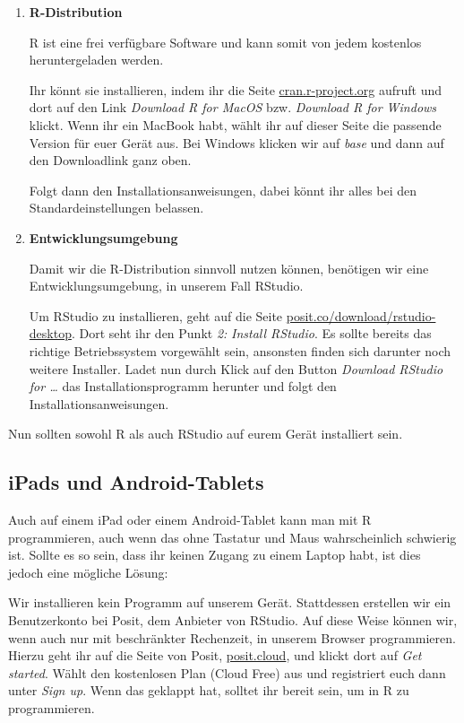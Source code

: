 \documentclass[
  letterpaper,
  DIV=11,
  numbers=noendperiod]{scrartcl}
\begin{document}
\begin{enumerate}
\def\labelenumi{\arabic{enumi}.}
\item
  \textbf{R-Distribution}

  R ist eine frei verfügbare Software und kann somit von jedem kostenlos
  heruntergeladen werden.

  Ihr könnt sie installieren, indem ihr die Seite
  \href{https://cran.r-project.org}{cran.r-project.org} aufruft und dort
  auf den Link \emph{Download R for MacOS} bzw. \emph{Download R for
  Windows} klickt. Wenn ihr ein MacBook habt, wählt ihr auf dieser Seite
  die passende Version für euer Gerät aus. Bei Windows klicken wir auf
  \emph{base} und dann auf den Downloadlink ganz oben.

  Folgt dann den Installationsanweisungen, dabei könnt ihr alles bei den
  Standardeinstellungen belassen.
\item
  \textbf{Entwicklungsumgebung}

  Damit wir die R-Distribution sinnvoll nutzen können, benötigen wir
  eine Entwicklungsumgebung, in unserem Fall RStudio.

  Um RStudio zu installieren, geht auf die Seite
  \href{https://posit.co/download/rstudio-desktop}{posit.co/download/rstudio-desktop}.
  Dort seht ihr den Punkt \emph{2:} \emph{Install RStudio}. Es sollte
  bereits das richtige Betriebssystem vorgewählt sein, ansonsten finden
  sich darunter noch weitere Installer. Ladet nun durch Klick auf den
  Button \emph{Download RStudio for \ldots{}} das Installationsprogramm
  herunter und folgt den Installationsanweisungen.
\end{enumerate}

Nun sollten sowohl R als auch RStudio auf eurem Gerät installiert sein.

\hypertarget{ipads-und-android-tablets}{%
\subsection{iPads und Android-Tablets}\label{ipads-und-android-tablets}}

Auch auf einem iPad oder einem Android-Tablet kann man mit R
programmieren, auch wenn das ohne Tastatur und Maus wahrscheinlich
schwierig ist. Sollte es so sein, dass ihr keinen Zugang zu einem Laptop
habt, ist dies jedoch eine mögliche Lösung:

Wir installieren kein Programm auf unserem Gerät. Stattdessen erstellen
wir ein Benutzerkonto bei Posit, dem Anbieter von RStudio. Auf diese
Weise können wir, wenn auch nur mit beschränkter Rechenzeit, in unserem
Browser programmieren. Hierzu geht ihr auf die Seite von Posit,
\href{https://posit.cloud}{posit.cloud}, und klickt dort auf \emph{Get
started}. Wählt den kostenlosen Plan (Cloud Free) aus und registriert
euch dann unter \emph{Sign up}. Wenn das geklappt hat, solltet ihr
bereit sein, um in R zu programmieren.
\end{document}
